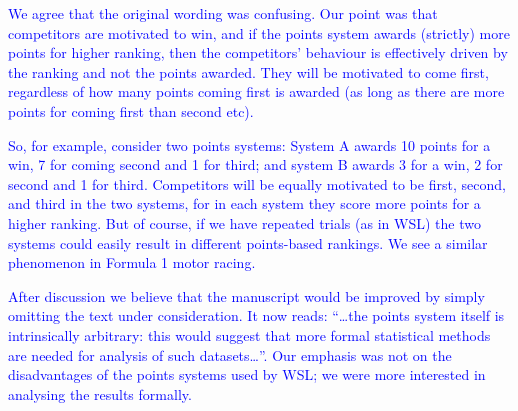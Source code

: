 \documentclass[12pt]{article}
\begin{document}
\textcolor{blue}{We agree that the original wording was confusing.
  Our point was that competitors are motivated to win, and if the
  points system awards (strictly) more points for higher ranking, then
  the competitors' behaviour is effectively driven by the ranking and
  not the points awarded.  They will be motivated to come first,
  regardless of how many points coming first is awarded (as long as
  there are more points for coming first than second etc).  }

\textcolor{blue}{
  So, for example, consider two points systems: System A awards 10
  points for a win, 7 for coming second and 1 for third; and system B
  awards 3 for a win, 2 for second and 1 for third.  Competitors will
  be equally motivated to be first, second, and third in the two
  systems, for in each system they score more points for a higher
  ranking.  But of course, if we have repeated trials (as in WSL) the
  two systems could easily result in different points-based rankings.
  We see a similar phenomenon in Formula 1 motor racing.}
 
\textcolor{blue}{ After discussion we believe that the manuscript
  would be improved by simply omitting the text under consideration.
  It now reads: ``\ldots the points system itself is intrinsically
  arbitrary: this would suggest that more formal statistical methods
  are needed for analysis of such datasets\ldots''.  Our emphasis was
  not on the disadvantages of the points systems used by WSL; we were
  more interested in analysing the results formally.
}
\end{document}
